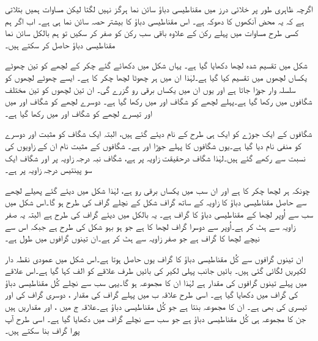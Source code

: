 اگرچہ ظاہری طور پر خلائی درز میں مقناطیسی دباؤ سائن نما ہرگز نہیں لگتا لیکن مساوات  ہمیں بتلاتی ہے کہ یہ محض آنکھوں کا دھوکہ ہے۔ اس مقناطیسی دباؤ کا بیشتر حصہ سائن نما ہی ہے۔  اب اگر ہم کسی طرح مساوات   میں پہلے رکن کے علاوہ باقی سب رکن کو صفر کر سکیں تو ہم بالکل  سائن نما مقناطیسی دباؤ حاصل کر سکتے ہیں۔

شکل  میں تقسیم شدہ لچھا دکھایا گیا ہے۔ یہاں شکل  میں دکھائے گئے  چکر کے لچھے کو تین چھوٹے یکساں لچھوں میں تقسیم کیا گیا ہے۔لہٰذا ان میں ہر چھوٹا لچھا  چکر کا ہے۔  ایسے چھوٹے لچھوں کو سلسلہ وار جوڑا جاتا ہے اور  یوں ان میں یکساں  برقی رو  گزرے گی۔ ان تین لچھوں کو تین مختلف شگافوں میں رکھا گیا ہے۔پہلے لچھے کو شگاف  اور  میں رکھا گیا ہے۔ دوسرے لچھے کو شگاف  اور  میں اور تیسرے لچھے کو شگاف  اور  میں رکھا گیا ہے۔

شگافوں کے ایک جوڑے کو ایک ہی طرح کے نام دیئے گئے ہیں، البتہ ایک شگاف کو مثبت اور دوسرے کو منفی نام دیا گیا ہے۔یوں شگافوں کا پہلے جوڑا   اور   ہے۔ شگافوں کے مثبت نام ان کے زاویوں کی نسبت سے رکھے گئے ہیں۔لہٰذا شگاف   درحقیقت  زاویہ پر ہے، شگاف  نبہ درجہ زاویہ پر اور شگاف   ایک سو پینتیس درجہ زاویہ پر ہے۔

چونکہ ہر لچھا  چکر کا ہے اور ان سب میں یکساں برقی رو  ہے،  لہٰذا  شکل میں دیئے گئے پھیلے لچھے سے حاصل مقناطیسی دباؤ کا زاویہ کے ساتھ گراف شکل  کے نچلے گراف کی طرح ہو گا۔اس شکل میں سب سے اُوپر لچھا    کے مقناطیسی دباؤ کا گراف ہے۔ یہ بالکل  میں دیئے گراف کی طرح ہے البتہ یہ صفر زاویہ سے  ہٹ کر ہے۔اُوپر سے دوسرا گراف لچھا  کا ہے جو ہو بہو شکل  کی طرح ہے جبکہ اس سے نیچے لچھا  کا گراف ہے جو صفر زاویہ سے  ہٹ کر ہے۔ان تینوں گرافوں میں طول  ہے۔

ان تینوں گرافوں سے کُل مقناطیسی دباؤ کا گراف یوں حاصل ہوتا ہے۔اس شکل میں عمودی نقطہ دار لکیریں لگائی گئی ہیں۔ بائیں جانب پہلی لکیر کی بائیں طرف علاقے کو الف کہا گیا ہے۔اس علاقے میں پہلے تینوں گرافوں کی مقدار  ہے لہٰذا ان کا مجموعہ  ہو گا۔یہی سب سے نچلے کُل مقناطیسی دباؤ کی گراف میں دکھایا گیا ہے۔ اسی طرح علاقہ ب میں پہلے گراف کی مقدار  ، دوسری گراف کی  اور تیسری کی بھی  ہے۔ ان کا مجموعہ  بنتا ہے جو کُل مقناطیسی دباؤ ہے۔علاقہ ج میں
 ،  اور  مقداریں ہیں جن کا مجموعہ  ہی کُل مقناطیسی دباؤ ہے جو سب سے نچلے گراف میں دکھایا گیا ہے۔ اسی طرح آپ پورا گراف بنا سکتے ہیں۔

